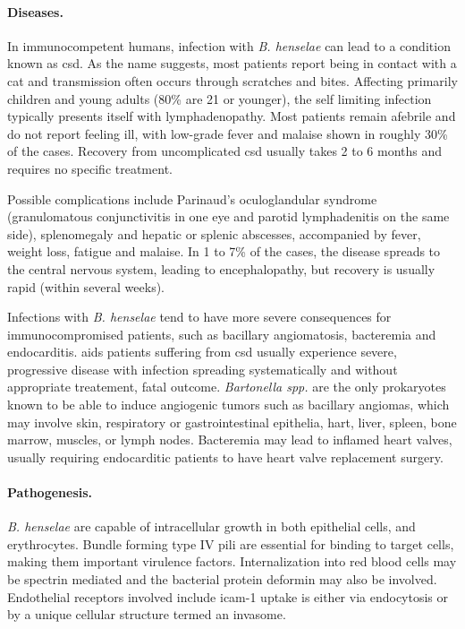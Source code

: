 \paragraph{Diseases.}
In immunocompetent humans, infection with \textit{B. henselae} can lead to a condition known as \gls{csd}. As the name suggests, most patients report being in contact with a cat and transmission often occurs through scratches and bites. Affecting primarily children and young adults (80\% are 21 or younger), the self limiting infection typically presents itself with lymphadenopathy. Most patients remain afebrile and do not report feeling ill, with low-grade fever and malaise shown in roughly 30\% of the cases. Recovery from uncomplicated \gls{csd} usually takes 2 to 6 months and requires no specific treatment.

Possible complications include Parinaud's oculoglandular syndrome (granulomatous conjunctivitis in one eye and parotid lymphadenitis on the same side), splenomegaly and hepatic or splenic abscesses, accompanied by fever, weight loss, fatigue and malaise. In 1 to 7\% of the cases, the disease spreads to the central nervous system, leading to encephalopathy, but recovery is usually rapid (within several weeks).

Infections with \textit{B. henselae} tend to have more severe consequences for immunocompromised patients, such as bacillary angiomatosis, bacteremia and endocarditis. \Gls{aids} patients suffering from \gls{csd} usually experience severe, progressive disease with infection spreading systematically and without appropriate treatement, fatal outcome. \textit{Bartonella spp.} are the only prokaryotes known to be able to induce angiogenic tumors such as bacillary angiomas, which may involve skin, respiratory or gastrointestinal epithelia, hart, liver, spleen, bone marrow, muscles, or lymph nodes. Bacteremia may lead to inflamed heart valves, usually requiring endocarditic patients to have heart valve replacement surgery.

\paragraph{Pathogenesis.}
\textit{B. henselae} are capable of intracellular growth in both epithelial cells, and erythrocytes. Bundle forming type IV pili are essential for binding to target cells, making them important virulence factors. Internalization into red blood cells may be spectrin mediated and the bacterial protein deformin may also be involved. Endothelial receptors involved include \gls{icam-1} uptake is either via endocytosis or by a unique cellular structure termed an invasome.


